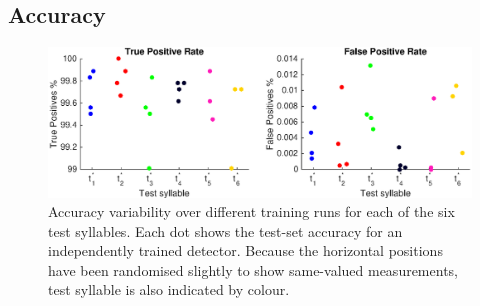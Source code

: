 \documentclass[10pt,letterpaper]{article}
\begin{document}
\subsection{Accuracy}


\begin{figure}
  \begin{center}
    \includegraphics[width=\textwidth]{Accuracies}
  \end{center}
  \caption{Accuracy variability over different training runs for each of the six test syllables.  Each dot shows the test-set accuracy for an independently trained detector.  Because the horizontal positions have been randomised slightly to show same-valued measurements, test syllable is also indicated by colour.}
  \label{fig:accuracies}
\end{figure}
\end{document}
